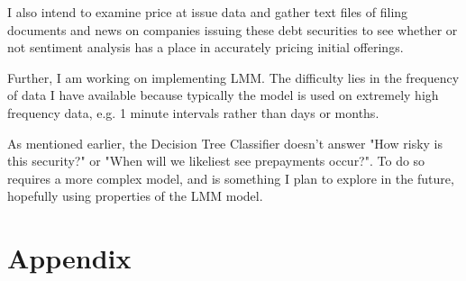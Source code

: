 \documentclass{article}
\begin{document}
I also intend to examine price at issue data and gather text files of filing documents and news on companies issuing these debt securities to see whether or not sentiment analysis has a place in accurately pricing initial offerings.

Further, I am working on implementing LMM. The difficulty lies in the frequency of data I have available because typically the model is used on extremely high frequency data, e.g. 1 minute intervals rather than days or months.

As mentioned earlier, the Decision Tree Classifier doesn't answer "How risky is this security?" or "When will we likeliest see prepayments occur?". To do so requires a more complex model, and is something I plan to explore in the future, hopefully using properties of the LMM model. 
\section*{Appendix}
\end{document}
